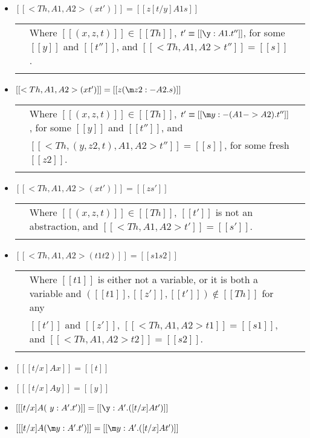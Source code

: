 \begin{definition}
\begin{itemize}
  \item[] $[[<Th,A1,A2>(x t')]] = [[z [t/y] A1 s]]$\\
    \begin{tabular}{lll}
      & Where $[[(x,z,t)]] \in [[Th]]$, $t' \equiv [[\y:A1.t'']]$, for some $[[y]]$ and
      $[[t'']]$, and $[[<Th,A1,A2>t'']] = [[s]]$.\\
      & \\
    \end{tabular}
  \item[] $[[<Th,A1,A2>(x t')]] = [[z (\m z2:{-A2}.s)]]$\\
    \begin{tabular}{lll}
      & Where $[[(x,z,t)]] \in [[Th]]$, $t' \equiv [[\m y:{-(A1 -> A2)}.t'']]$, for some $[[y]]$ and $[[t'']]$, and \\
      & $[[<Th,(y,z2,t),A1,A2>t'']] = [[s]]$, for some fresh $[[z2]]$.\\
      & \\
    \end{tabular}
  \item[] $[[<Th,A1,A2>(x t')]] = [[z s']]$\\
    \begin{tabular}{lll}
      & Where $[[(x,z,t)]] \in [[Th]]$, $[[t']]$ is not an abstraction, and $[[<Th,A1,A2>t']] = [[s']]$.\\
      & \\
    \end{tabular}
  \item[] $[[<Th,A1,A2>(t1 t2)]] = [[s1 s2]]$\\
    \begin{tabular}{lll}
      & Where $[[t1]]$ is either not a variable, or it is both a variable
      and $([[t1]],[[z']],[[t']]) \not \in [[Th]]$ for any \\
      & $[[t']]$ and $[[z']]$, $[[<Th,A1,A2>t1]] = [[s1]]$, and $[[<Th,A1,A2>t2]] = [[s2]]$.\\
      & \\
    \end{tabular}

  \item[] $[[ [t/x] A x]] = [[t]]$
  \item[] $[[ [t/x] A y]] = [[y]]$\\

  \item[] $[[ [t/x] A (\ y:A'.t')]] = [[\y:A'.([t/x ] A t')]]$
  \item[] $[[ [t/x] A (\m y:A'.t')]] = [[\m y:A'.([t/x] A t')]]$\\


\end{itemize}
\end{definition}
